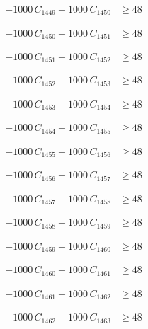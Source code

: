 \documentclass[a4paper,11pt]{article}
\begin{document}
\begin{align}
-1000\,C_{1449} + 1000\,C_{1450} &\geq 48 \nonumber
\end{align}

\begin{align}
-1000\,C_{1450} + 1000\,C_{1451} &\geq 48 \nonumber
\end{align}

\begin{align}
-1000\,C_{1451} + 1000\,C_{1452} &\geq 48 \nonumber
\end{align}

\begin{align}
-1000\,C_{1452} + 1000\,C_{1453} &\geq 48 \nonumber
\end{align}

\begin{align}
-1000\,C_{1453} + 1000\,C_{1454} &\geq 48 \nonumber
\end{align}

\begin{align}
-1000\,C_{1454} + 1000\,C_{1455} &\geq 48 \nonumber
\end{align}

\begin{align}
-1000\,C_{1455} + 1000\,C_{1456} &\geq 48 \nonumber
\end{align}

\begin{align}
-1000\,C_{1456} + 1000\,C_{1457} &\geq 48 \nonumber
\end{align}

\begin{align}
-1000\,C_{1457} + 1000\,C_{1458} &\geq 48 \nonumber
\end{align}

\begin{align}
-1000\,C_{1458} + 1000\,C_{1459} &\geq 48 \nonumber
\end{align}

\begin{align}
-1000\,C_{1459} + 1000\,C_{1460} &\geq 48 \nonumber
\end{align}

\begin{align}
-1000\,C_{1460} + 1000\,C_{1461} &\geq 48 \nonumber
\end{align}

\begin{align}
-1000\,C_{1461} + 1000\,C_{1462} &\geq 48 \nonumber
\end{align}

\begin{align}
-1000\,C_{1462} + 1000\,C_{1463} &\geq 48 \nonumber
\end{align}
\end{document}
